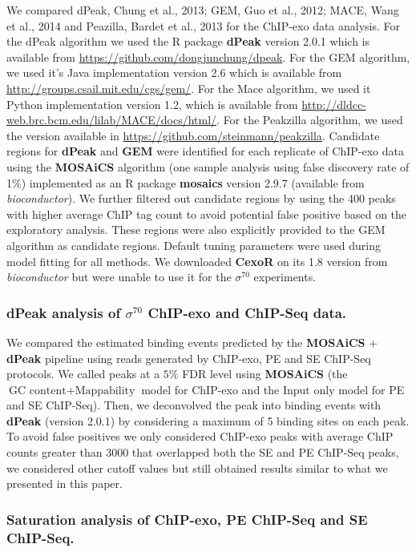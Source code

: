 \documentclass{bmcart}
\newcommand{\sig}{\sigma^{70}}
\begin{document}
We compared dPeak, Chung et al., 2013; GEM, Guo et al., 2012; MACE,
Wang et al., 2014 and Peazilla, Bardet et al., 2013 for the ChIP-exo
data analysis. For the dPeak algorithm we used the R package
\textbf{dPeak} version 2.0.1 which is available from
\url{https://github.com/dongjunchung/dpeak}. For the GEM algorithm, we
used it's Java implementation version 2.6 which is available from
\url{http://groups.csail.mit.edu/cgs/gem/}. For the Mace algorithm, we
used it Python implementation version 1.2, which is available from
\url{http://dldcc-web.brc.bcm.edu/lilab/MACE/docs/html/}. For the
Peakzilla algorithm, we used the version available in
\url{https://github.com/steinmann/peakzilla}. Candidate regions for
\textbf{dPeak} and \textbf{GEM} were identified for each replicate of
ChIP-exo data using the \textbf{MOSAiCS} algorithm \cite{mosaics} (one
sample analysis using false discovery rate of 1\%) implemented as an R
package \textbf{mosaics} version 2.9.7 (available from
\emph{bioconductor}). We further filtered out candidate regions by
using the 400 peaks with higher average ChIP tag count to avoid
potential false positive based on the exploratory analysis. These
regions were also explicitly provided to the GEM algorithm as
candidate regions. Default tuning parameters were used during model
fitting for all methods. We downloaded \textbf{CexoR} \cite{cexor} on
its 1.8 version from \emph{bioconductor} but were unable to use it for
the $\sig$ experiments.

\subsubsection*{dPeak analysis of $\sig$ ChIP-exo and ChIP-Seq data.}

We compared the estimated binding events predicted by the
\textbf{MOSAiCS} + \textbf{dPeak} pipeline using reads generated by
ChIP-exo, PE and SE ChIP-Seq protocols. We called peaks at a $5\%$ FDR
level using \textbf{MOSAiCS} (the $\mbox{GC content} +
\mbox{Mappability}$ model for ChIP-exo and the $\mbox{Input only}$
model for PE and SE ChIP-Seq). Then, we deconvolved the peak into
binding events with \textbf{dPeak} (version 2.0.1) by considering a
maximum of 5 binding sites on each peak. To avoid false positives we
only considered ChIP-exo peaks with average ChIP counts greater than
3000 that overlapped both the SE and PE ChIP-Seq peaks, we considered
other cutoff values but still obtained results similar to what we
presented in this paper.

\subsubsection*{Saturation analysis of ChIP-exo, PE ChIP-Seq and SE ChIP-Seq.}
\end{document}
